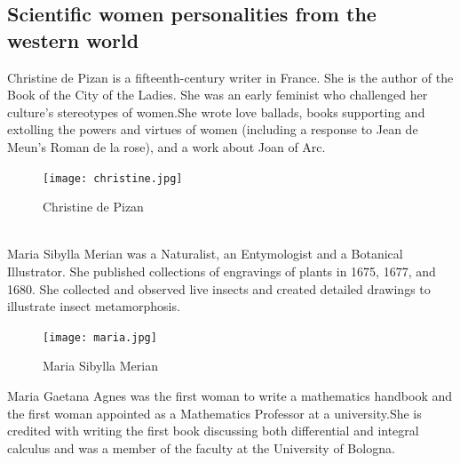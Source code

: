 \documentclass[a4paper,10pt]{article}
\begin{document}
\subsection{Scientific women personalities from the western world}
\newblock
Christine de Pizan is a fifteenth-century writer in France. She is the author of the Book of the City of the Ladies. She was an early feminist who challenged her culture's stereotypes of women.She wrote love ballads, books supporting and extolling the powers and virtues of women (including a response to Jean de Meun's Roman de la rose), and a work about Joan of Arc.\cite{christine}\\

\begin{center}
\begin{figure}[h]
\centering
 \texttt{[image: christine.jpg]}
 \caption{Christine de Pizan}
\end{figure}
\end{center}

\newblock
\\
Maria Sibylla Merian was a Naturalist, an Entymologist and a Botanical Illustrator. She published collections of engravings of plants in 1675, 1677, and 1680. She collected and observed live insects and created detailed drawings to illustrate insect metamorphosis.\cite{merian}


\begin{center}
\begin{figure}[h]
\centering
 \texttt{[image: maria.jpg]}
 \caption{Maria Sibylla Merian}
\end{figure}
\end{center}


\newblock
Maria Gaetana Agnes was the first woman to write a mathematics handbook and the first woman appointed as a Mathematics Professor at a university.She is credited with writing the first book discussing both differential and integral calculus and was a member of the faculty at the University of Bologna\cite{agnesi}.
\end{document}
